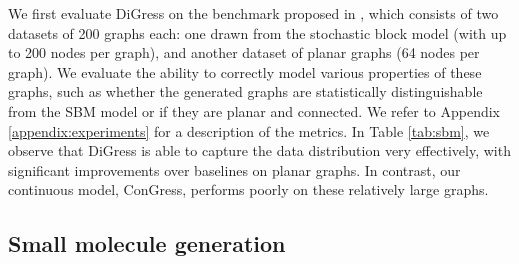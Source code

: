\documentclass{article} %
\theoremstyle{plain}
\theoremstyle{definition}
\theoremstyle{remark}
\begin{document}
 
We first evaluate DiGress on the benchmark proposed in \cite{martinkus2022spectre}, which consists of two datasets of 200 graphs each: one drawn from the stochastic block model (with up to 200 nodes per graph), and another dataset of planar graphs (64 nodes per graph). We evaluate the ability to correctly model various properties of these graphs, such as whether the generated graphs are statistically distinguishable from the SBM model or if they are planar and connected. We refer to Appendix \ref{appendix:experiments} for a description of the metrics. In Table \ref{tab:sbm}, we observe that DiGress is able to capture the data distribution very effectively, with significant improvements over baselines on planar graphs. In contrast, our continuous model, ConGress, performs poorly on these relatively large graphs.


\subsection{Small molecule generation}
\end{document}

